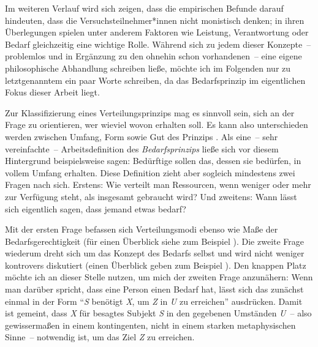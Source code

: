\documentclass[justified,nobib,nohyper,symmetric,twoside]{tufte-book}
\begin{document}
Im weiteren Verlauf wird sich zeigen, dass die empirischen Befunde darauf hindeuten, dass die Versuchsteilnehmer*innen nicht monistisch denken; in ihren Überlegungen spielen unter anderem Faktoren wie Leistung, Verantwortung oder Bedarf gleichzeitig eine wichtige Rolle.
Während sich zu jedem dieser Konzepte~-- problemlos und in Ergänzung zu den ohnehin schon vorhandenen~-- eine eigene philosophische Abhandlung schreiben ließe, möchte ich im Folgenden nur zu letztgenanntem ein paar Worte schreiben, da das Bedarfsprinzip im eigentlichen Fokus dieser Arbeit liegt.

Zur Klassifizierung eines Verteilungsprinzips mag es sinnvoll sein, sich an der Frage zu orientieren, wer wieviel wovon erhalten soll.
Es kann also unterschieden werden zwischen Umfang, Form sowie Gut des Prinzips \citep{page_climate_2006,siebel_need_2020}.
Als eine~-- sehr vereinfachte~-- Arbeitsdefinition des \textit{Bedarfsprinzips} ließe sich vor diesem Hintergrund beispielsweise sagen: Bedürftige sollen das, dessen sie bedürfen, in vollem Umfang erhalten.
Diese Definition zieht aber sogleich mindestens zwei Fragen nach sich.
Erstens: Wie verteilt man Ressourcen, wenn weniger oder mehr zur Verfügung steht, als insgesamt gebraucht wird?
Und zweitens: Wann lässt sich eigentlich sagen, dass jemand etwas bedarf?

Mit der ersten Frage befassen sich Verteilungsmodi ebenso wie Maße der Bedarfsgerechtigkeit (für einen Überblick siehe zum Beispiel \cite{brock_needs_2019,siebel_measuring_nd}).
Die zweite Frage wiederum dreht sich um das Konzept des Bedarfs selbst und wird nicht weniger kontrovers diskutiert (einen Überblick geben zum Beispiel \cite{siebel_need_2020,poelzler_basic_2021}).
Den knappen Platz möchte ich an dieser Stelle nutzen, um mich der zweiten Frage anzunähern:
Wenn man darüber spricht, dass eine Person einen Bedarf hat, lässt sich das zunächst einmal in der Form \enquote{\textit{S} benötigt \textit{X}, um \textit{Z} in \textit{U} zu erreichen} ausdrücken.
Damit ist gemeint, dass \textit{X} für besagtes Subjekt \textit{S} in den gegebenen Umständen \textit{U}~-- also gewissermaßen in einem kontingenten, nicht in einem starken metaphysischen Sinne~-- notwendig ist, um das Ziel \textit{Z} zu erreichen.
\end{document}
